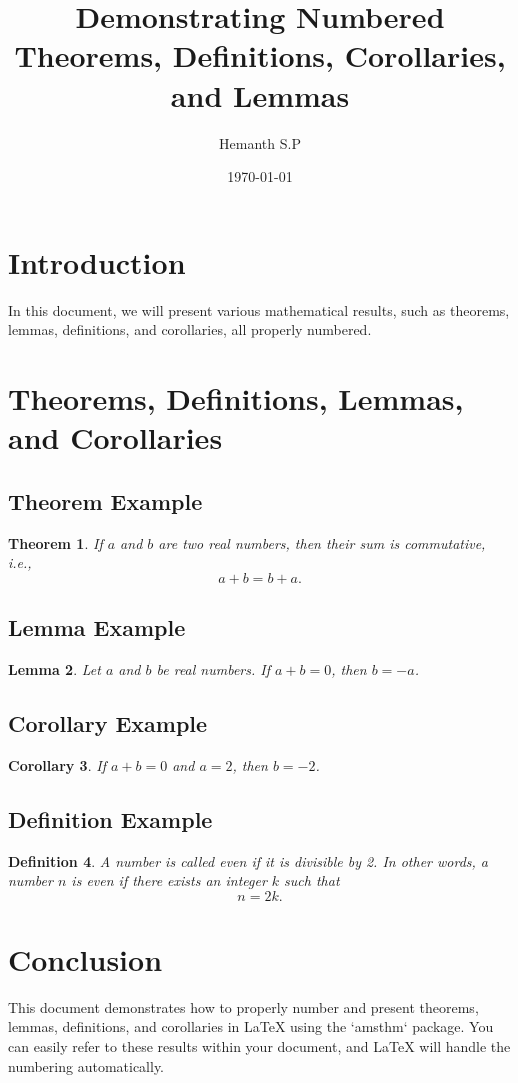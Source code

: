 \documentclass[a4paper,12pt]{article}
\newtheorem{theorem}{Theorem}[section]
\newtheorem{lemma}[theorem]{Lemma}
\newtheorem{corollary}[theorem]{Corollary}
\newtheorem{definition}[theorem]{Definition}
\begin{document}
 
\title{Demonstrating Numbered Theorems, Definitions, Corollaries, and Lemmas} 
\author{Hemanth S.P} 
\date{\today} 
\maketitle 
\section*{Introduction} In this document, we will present various mathematical results, such as 
theorems, lemmas, definitions, and corollaries, all properly numbered. 
\section{Theorems, Definitions, Lemmas, and Corollaries}  
\subsection*{Theorem Example} \begin{theorem} 
If \( a \) and \( b \) are two real numbers, then their sum is commutative, i.e.,  
\[ a + b = b + a. \] 
\end{theorem}  
\subsection*{Lemma Example}  
\begin{lemma}  
Let \( a \) and \( b \) be real numbers. If \( a + b = 0 \), then \( b = -a \).  
\end{lemma} 
\subsection*{Corollary Example}  
\begin{corollary} 
If \( a + b = 0 \) and \( a = 2 \), then \( b = -2 \).  
\end{corollary} 
\subsection*{Definition Example} 
\begin{definition}  
A number is called \textit{even} if it is divisible by 2. In other words, a number \( n \) is even if 
there exists an integer \( k \) such that  
\[ 
n = 2k. 
\]  
\end{definition}  
\section{Conclusion}  
This document demonstrates how to properly number and present theorems, lemmas, 
definitions, and corollaries in LaTeX using the `amsthm` package. You can easily refer to these 
results within your document, and LaTeX will handle the numbering automatically. 
\end{document}
